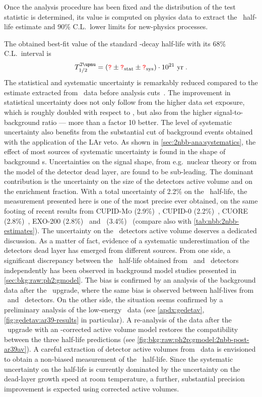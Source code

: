 Once the analysis procedure has been fixed and the distribution of the test statistic is
determined, its value is computed on physics data to extract the \nnbb\ half-life estimate
and 90\% C.L.~lower limits for new-physics processes.

The obtained best-fit value of the standard \nnbb-decay half-life with its 68\%
C.L.~interval is
\[
  \thalftwoM = (\fillme{?} \pm \stat{\fillme{?}} \pm \syst{\fillme{?}}) \cdot 10^{21}~\text{yr} \;.
\]
The statistical and systematic uncertainty is remarkably reduced compared to the estimate
extracted from \phaseone\ data before analysis cuts~\cite{Agostini2015a}. The improvement
in statistical uncertainty does not only follow from the higher data set exposure,
which is roughly doubled with respect to \phaseone, but also from the higher
signal-to-background ratio --- more than a factor 10 better. The level of systematic
uncertainty also benefits from the substantial cut of background events obtained with the
application of the LAr veto. As shown in \cref{sec:2nbb-ana:systematics}, the effect of
most sources of systematic uncertainty is found in the shape of background \pdf{}s.
Uncertainties on the signal shape, from e.g.~nuclear theory or from the model of the detector dead
layer, are found to be sub-leading. The dominant contribution is the uncertainty on the
size of the detectors active volume and on the enrichment fraction. With a total
uncertainty of 2.2\% on the \nnbb\ half-life, the measurement presented here is
one of the most precise ever obtained, on the same footing of recent results from
\textsc{CUPID-Mo} (2.9\%)~\cite{Armengaud2019}, CUPID-0 (2.2\%)~\cite{Azzolini2019a},
CUORE (2.8\%)~\cite{Caminata2019}, EXO-200 (2.8\%)~\cite{Albert2013} and \kamlandzen\
(3.4\%)~\cite{Gando2019} (compare also with \cref{tab:nbb:2nbb-estimates}).
\newpar
The uncertainty on the \bege\ detectors active volume deserves a dedicated discussion.
As a matter of fact, evidence of a systematic underestimation of the detectors dead layer
has emerged from different sources. From one side, a significant discrepancy between the
\nnbb\ half-life obtained from \scoax\ and \bege\ detectors independently has been
observed in background model studies presented in \cref{sec:bkg:raw:ph2:gmodel}. The bias
is confirmed by an analysis of the background data after the \phasetwop\ upgrade, where
the same bias is observed between half-lives from \bege\ and \icoax\ detectors. On the
other side, the situation seems confirmed by a preliminary analysis of the low-energy
\Arl\ data (see \cref{apdx:gedetav}, \cref{fig:gedetav:ar39-results} in particular). A
re-analysis of the data after the \phasetwop\ upgrade with an \Arl-corrected active
volume model restores the compatibility between the three half-life predictions (see
\cref{fig:bkg:raw:ph2p:gmodel:2nbb-post-ar39av}). A careful extraction of detector active
volumes from \Arl\ data is envisioned to obtain a non-biased measurement of the \nnbb\
half-life. Since the systematic uncertainty on the half-life is currently dominated by the
uncertainty on the dead-layer growth speed at room temperature, a further, substantial
precision improvement is expected using corrected active volumes.

